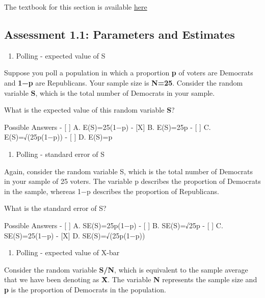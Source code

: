 \documentclass[
]{article}
\providecommand{\tightlist}{%
  \setlength{\itemsep}{0pt}\setlength{\parskip}{0pt}}
\begin{document}
The textbook for this section is available
\href{https://rafalab.github.io/dsbook/inference.html}{here}

\hypertarget{assessment-1.1-parameters-and-estimates}{%
\subsection{Assessment 1.1: Parameters and
Estimates}\label{assessment-1.1-parameters-and-estimates}}

\begin{enumerate}
\def\labelenumi{\arabic{enumi}.}
\tightlist
\item
  Polling - expected value of S
\end{enumerate}

Suppose you poll a population in which a proportion \textbf{p} of voters
are Democrats and \textbf{1−p} are Republicans. Your sample size is
\textbf{N=25}. Consider the random variable \textbf{S}, which is the
total number of Democrats in your sample.

What is the expected value of this random variable \textbf{S}?

Possible Answers - {[} {]} A. E(S)=25(1−p) - {[}X{]} B. E(S)=25p - {[}
{]} C. E(S)=√(25p(1−p)) - {[} {]} D. E(S)=p

\begin{enumerate}
\def\labelenumi{\arabic{enumi}.}
\setcounter{enumi}{1}
\tightlist
\item
  Polling - standard error of S
\end{enumerate}

Again, consider the random variable S, which is the total number of
Democrats in your sample of 25 voters. The variable p describes the
proportion of Democrats in the sample, whereas 1−p describes the
proportion of Republicans.

What is the standard error of S?

Possible Answers - {[} {]} A. SE(S)=25p(1−p) - {[} {]} B. SE(S)=√25p -
{[} {]} C. SE(S)=25(1−p) - {[}X{]} D. SE(S)=√(25p(1−p))

\begin{enumerate}
\def\labelenumi{\arabic{enumi}.}
\setcounter{enumi}{2}
\tightlist
\item
  Polling - expected value of X-bar
\end{enumerate}

Consider the random variable \textbf{S/N}, which is equivalent to the
sample average that we have been denoting as \textbf{X̄}. The variable
\textbf{N} represents the sample size and \textbf{p} is the proportion
of Democrats in the population.
\end{document}

